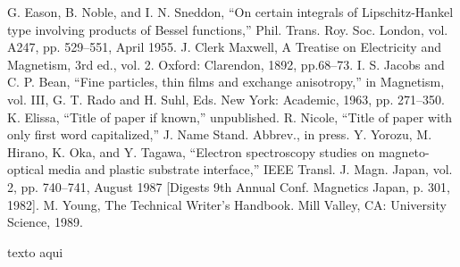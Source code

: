 \documentclass[relatorio]{IEEEtran}
\begin{document}
\begin{thebibliography}{00}
 G. Eason, B. Noble, and I. N. Sneddon, ``On certain integrals of Lipschitz-Hankel type involving products of Bessel functions,'' Phil. Trans. Roy. Soc. London, vol. A247, pp. 529--551, April 1955.
 J. Clerk Maxwell, A Treatise on Electricity and Magnetism, 3rd ed., vol. 2. Oxford: Clarendon, 1892, pp.68--73.
 I. S. Jacobs and C. P. Bean, ``Fine particles, thin films and exchange anisotropy,'' in Magnetism, vol. III, G. T. Rado and H. Suhl, Eds. New York: Academic, 1963, pp. 271--350.
 K. Elissa, ``Title of paper if known,'' unpublished.
 R. Nicole, ``Title of paper with only first word capitalized,'' J. Name Stand. Abbrev., in press.
 Y. Yorozu, M. Hirano, K. Oka, and Y. Tagawa, ``Electron spectroscopy studies on magneto-optical media and plastic substrate interface,'' IEEE Transl. J. Magn. Japan, vol. 2, pp. 740--741, August 1987 [Digests 9th Annual Conf. Magnetics Japan, p. 301, 1982].
 M. Young, The Technical Writer's Handbook. Mill Valley, CA: University Science, 1989.
\end{thebibliography}
\vspace{12pt}
\color{red}
texto aqui
\end{document}
